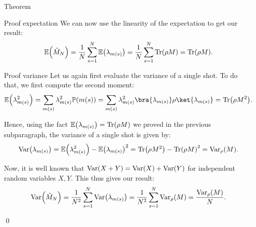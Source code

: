 \documentclass[a4paper]{article}
\begin{document}
\begin{parag}{Theorem}
\begin{subparag}{Proof expectation}
        We can now use the linearity of the expectation to get our result: 
        \[\exval\left(\hat{M}_N\right) = \frac{1}{N} \sum_{s=1}^{N} \exval\left(\lambda_{m\left(s\right)}\right) = \frac{1}{N} \sum_{s=1}^{N} \Tr\left(\rho M\right) = \Tr\left(\rho M\right).\]
    \end{subparag}

    \begin{subparag}{Proof variance}
        Let us again first evaluate the variance of a single shot. To do that, we first compute the second moment: 
        \[\exval\left(\lambda_{m\left(s\right)}^2\right) = \sum_{m\left(s\right)} \lambda_{m\left(s\right)}^2 \prob\left(m\left(s\right)\right) = \sum_{m\left(s\right)} \lambda_{m\left(s\right)}^2 \bra{\lambda_{m\left(s\right)}} \rho \ket{\lambda_{m\left(s\right)}} = \Tr\left(\rho M^2\right).\]

        Hence, using the fact $\exval\left(\lambda_{m\left(s\right)}\right) = \Tr\left(\rho M\right)$ we proved in the previous subparagraph, the variance of a single shot is given by: 
        \[\Var\left(\lambda_{m\left(s\right)}\right) = \exval\left(\lambda_{m\left(s\right)}^2\right) - \exval\left(\lambda_{m\left(s\right)}\right)^2 = \Tr\left(\rho M^2\right) - \Tr\left(\rho M\right)^2 = \Var_{\rho}\left(M\right).\]
       
        Now, it is well known that $\Var\left(X + Y\right) = \Var\left(X\right) + \Var\left(Y\right)$ for independent random variables $X, Y$. This thus gives our result: 
        \[\Var\left(\hat{M}_N\right) = \frac{1}{N^2} \sum_{s=1}^{N} \Var\left(\lambda_{m\left(s\right)}\right) = \frac{1}{N^2} \sum_{s=1}^{N} \Var_{\rho}\left(M\right) = \frac{\Var_{\rho}\left(M\right)}{N}.\]

        \qed
    \end{subparag}
\end{parag}
\end{document}
